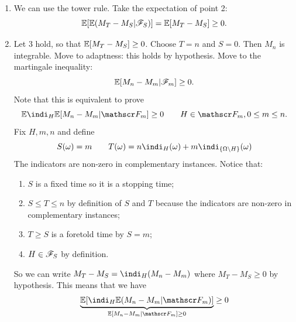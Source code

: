 \documentclass{report}
\begin{document}
\begin{fancyproof}
\begin{enumerate}
\begin{align*}
			&\underset{\mathllap{\text{discr. time int.}}}{=}\ev[X_{n}-X_{0}]\\
			&\underset{\mathllap{\text{proved above}}}{\geq}0
		\end{align*}
		and this is true $\every V>0,V<b,V\in\F_{s}$. Hence
		\begin{equation*}
			\ev(M_{T}-M_{S}|\F_{S})\geq 0
		\end{equation*}
		So $1\to2$.
		\item[$2\to3$] We can use the tower rule. Take the expectation of point 2:
		\[\mathbb{E}[\mathbb{E}(M_{T}-M_{S}|\mathscr{F}_{S})]=\mathbb{E}[M_{T}-M_{S}]\geq0.\]
		\item[$3\to1$] Let $3$ hold, so that $\mathbb{E}[M_{T}-M_{S}]\geq0$. Choose $T=n$ and $S=0$. Then
	$M_{n}$ is integrable. Move to adaptness: this holds by hypothesis. Move to the martingale inequality:
	\begin{equation*}
		\mathbb{E}[M_{n}-M_{m}|\mathscr{F}_{m}]\geq0.
	\end{equation*}
	Note that this is equivalent to prove 
	\begin{equation*}
		\ev\indi_H\ev[M_{n}-M_{m}|\F_{m}]\geq0\qquad H\in\F_{m},0\leq m\leq n.
	\end{equation*}
	Fix $H,m,n$ and define
	\begin{equation*}
		S(\omega)=m\qquad T(\omega)=n\indi_H(\omega)+m\indi_{\{\Omega\setminus H\}}(\omega)
	\end{equation*}
	The indicators are non-zero in complementary instances. Notice that:
	\begin{enumerate}
		\item $S$ is a fixed time so it is a stopping time;
		\item $S\leq T\leq n$ by definition of $S$ and $T$ because the indicators are non-zero in complementary instances;
		\item $T\geq S$ is a foretold time by $S=m$;
		\item $H\in\mathscr{F}_{S}$ by definition.
	\end{enumerate}
	So we can write $M_{T}-M_{S}=\indi_H(M_{n}-M_{m})$ where $M_{T}-M_{S}\geq0$ by hypothesis. This means that we have 
	\begin{equation*}
		\underbrace{\ev[\indi_{H}\ev(M_{n}-M_{m}|\F_{m})]}_{\ev[M_{n}-M_{m}|\F_{m}]\geq0}\geq0
	\end{equation*}
	\end{enumerate}
\end{fancyproof}
\end{document}
